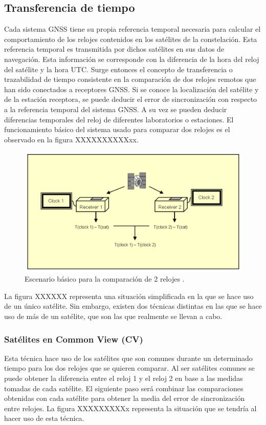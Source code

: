\subsection{Transferencia de tiempo}

Cada sistema GNSS tiene su propia referencia temporal necesaria para calcular el comportamiento de los relojes contenidos en los satélites de la constelación. Esta referencia temporal es transmitida por dichos satélites en sus datos de navegación. Esta información se corresponde con la diferencia de la hora del reloj del satélite y la hora UTC. Surge entonces el concepto de transferencia o trazabilidad de tiempo consistente en la comparación de dos relojes remotos que han sido conectados a receptores GNSS. Si se conoce la localización del satélite y de la estación receptora, se puede deducir el error de sincronización con respecto a la referencia temporal del sistema GNSS. A su vez se pueden deducir diferencias temporales del reloj de diferentes laboratorios o estaciones. El funcionamiento básico del sistema usado para comparar dos relojes es el observado en la figura XXXXXXXXXXxx.

\begin{figure}
	\centering
	\includegraphics[width=1\textwidth]{imagenes/2clockscompare.PNG}
	\caption{\label{fig1}Escenario básico para la comparación de 2 relojes \cite{gnss}.}
\end{figure}

La figura XXXXXX representa una situación simplificada en la que se hace uso de un único satélite. Sin embargo, existen dos técnicas distintas en las que se hace uso de más de un satélite, que son las que realmente se llevan a cabo.

\subsubsection{Satélites en Common View (CV)}
Esta técnica hace uso de los satélites que son comunes durante un determinado tiempo para los dos relojes que se quieren comparar. Al ser satélites comunes se puede obtener la diferencia entre el reloj 1 y el reloj 2 en base a las medidas tomadas de cada satélite. El siguiente paso será combinar las comparaciones obtenidas con cada satélite para obtener la media del error de sincronización entre relojes. La figura XXXXXXXXXx representa la situación que se tendría al hacer uso de esta técnica.

